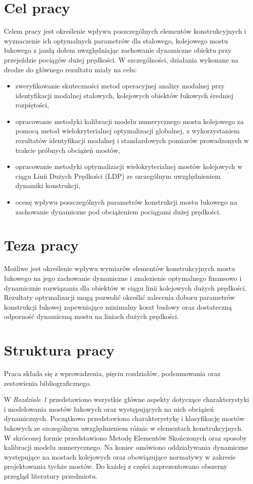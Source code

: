 \section*{Cel pracy}
Celem pracy jest określenie wpływu poszczególnych elementów konstrukcyjnych i wyznaczenie ich optymalnych parametrów dla stalowego, kolejowego mostu łukowego z jazdą dołem uwzględniając zachowanie dynamiczne obiektu przy przejeździe pociągów dużej prędkości.
W szczególności, działania wykonane na drodze do głównego rezultatu miały na celu:
\begin{itemize}
	\item zweryfikowanie skuteczności metod operacyjnej analizy modalnej przy identyfikacji modalnej stalowych, kolejowych obiektów łukowych średniej rozpiętości,
	\item opracowanie metodyki kalibracji modelu numerycznego mostu kolejowego za pomocą metod wielokryterialnej optymalizacji globalnej, z wykorzystaniem rezultatów identyfikacji modalnej i standardowych pomiarów prowadzonych w trakcie próbnych obciążeń mostów,
	\item opracowanie metodyki optymalizacji wielokryterialnej mostów kolejowych w ciągu Linii Dużych Prędkości (LDP) ze szczególnym uwzględnieniem dynamiki konstrukcji,
	\item ocenę wpływu poszczególnych parametrów konstrukcji mostu łukowego na zachowanie dynamiczne pod obciążeniem pociągami dużej prędkości.
\end{itemize}


\section*{Teza pracy}
Możliwe jest określenie wpływu wymiarów elementów konstrukcyjnych mostu łukowego na jego zachowanie dynamiczne i znalezienie optymalnego finansowo i dynamicznie rozwiązania dla obiektów w ciągu linii kolejowych dużych prędkości. Rezultaty optymalizacji mogą pozwolić określić zalecenia doboru parametrów konstrukcji łukowej zapewniające minimalny koszt budowy oraz dostateczną odporność dynamiczną mostu na liniach dużych prędkości.

\section*{Struktura pracy}
Praca składa się z wprowadzenia, pięciu rozdziałów, podsumowania oraz zestawienia bibliograficznego. 

W \textit{Rozdziale 1} przedstawiono wszystkie główne aspekty dotyczące charakterystyki i modelowania mostów łukowych oraz występujących na nich obciążeń dynamicznych. Początkowo przedstawiono charakterystykę i klasyfikację mostów łukowych ze szczególnym uwzględnieniem różnic w elementach konstrukcyjnych. W skróconej formie przedstawiono Metodę Elementów Skończonych oraz sposoby kalibracji modelu numerycznego. Na koniec omówiono oddziaływania dynamiczne występujące na mostach kolejowych oraz obowiązujące normatywy w zakresie projektowania tychże mostów. Do każdej z części zaprezentowano obszerny przegląd literatury przedmiotu.

